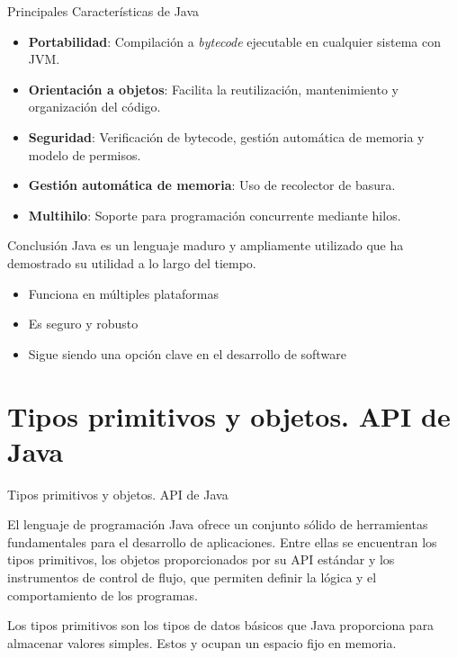 \documentclass{beamer}
\begin{document}
\begin{frame}{Principales Características de Java}
\begin{itemize}
    \item \textbf{Portabilidad}: Compilación a \textit{bytecode} ejecutable en cualquier sistema con JVM.
    \item \textbf{Orientación a objetos}: Facilita la reutilización, mantenimiento y organización del código.
    \item \textbf{Seguridad}: Verificación de bytecode, gestión automática de memoria y modelo de permisos.
    \item \textbf{Gestión automática de memoria}: Uso de recolector de basura.
    \item \textbf{Multihilo}: Soporte para programación concurrente mediante hilos.
\end{itemize}
\end{frame}


\begin{frame}{Conclusión}
Java es un lenguaje maduro y ampliamente utilizado que ha demostrado su utilidad a lo largo del tiempo.

\begin{itemize}
    \item Funciona en múltiples plataformas
    \item Es seguro y robusto
    \item Sigue siendo una opción clave en el desarrollo de software
\end{itemize}
\end{frame}

\section{Tipos primitivos y objetos. API de Java}

\begin{frame}{Tipos primitivos y objetos. API de Java}
  

El lenguaje de programación Java ofrece un conjunto sólido de herramientas fundamentales para el desarrollo de aplicaciones. Entre ellas se encuentran los tipos primitivos, los objetos proporcionados por su API estándar y los instrumentos de control de flujo, que permiten definir la lógica y el comportamiento de los programas.

Los tipos primitivos son los tipos de datos básicos que Java proporciona para almacenar valores simples. Estos  y ocupan un espacio fijo en memoria.

\end{frame}
\end{document}
